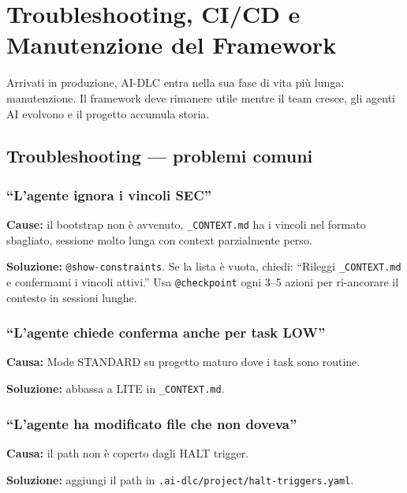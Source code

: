 ﻿%

\chapter{Troubleshooting, CI/CD e Manutenzione del Framework}
\label{ch:produzione}

Arrivati in produzione, AI-DLC entra nella sua fase di vita più lunga: manutenzione. Il framework deve rimanere utile mentre il team cresce, gli agenti AI evolvono e il progetto accumula storia.

\section{Troubleshooting --- problemi comuni}
\label{sec:16-troubleshooting}

\subsection*{``L'agente ignora i vincoli SEC''}

\textbf{Cause:} il bootstrap non è avvenuto, \texttt{\_CONTEXT.md} ha i vincoli nel formato sbagliato, sessione molto lunga con context parzialmente perso.

\textbf{Soluzione:} \texttt{@show-constraints}. Se la lista è vuota, chiedi: ``Rileggi \texttt{\_CONTEXT.md} e confermami i vincoli attivi.'' Usa \texttt{@checkpoint} ogni 3--5 azioni per ri-ancorare il contesto in sessioni lunghe.

\subsection*{``L'agente chiede conferma anche per task LOW''}

\textbf{Causa:} Mode STANDARD su progetto maturo dove i task sono routine.

\textbf{Soluzione:} abbassa a LITE in \texttt{\_CONTEXT.md}.

\subsection*{``L'agente ha modificato file che non doveva''}

\textbf{Causa:} il path non è coperto dagli HALT trigger.

\textbf{Soluzione:} aggiungi il path in \texttt{.ai-dlc/project/halt-triggers.yaml}.

